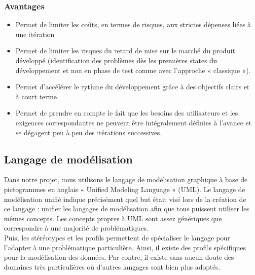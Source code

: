 \documentclass[12 pt ]{report}
\begin{document}
\subsubsection{Avantages }
\begin{itemize}[font=\color{green} \Large, label=]

\item Permet de limiter les coûts, en termes de risques, aux strictes dépenses liées à une itération
\item 	Permet de limiter les risques du retard de mise sur le marché du produit développé (identification des problèmes dès les premières states du développement et non en phase de test comme avec l’approche « classique »).
\item Permet d’accélérer le rythme du développement grâce à des objectifs clairs et à court terme.
\item Permet de prendre en compte le fait que les besoins des utilisateurs et les exigences correspondantes ne peuvent être intégralement définies à l’avance et se dégagent peu à peu des itérations successives.  
\end{itemize}
\subsection{Langage de modélisation }
     Dans notre projet, nous utilisons le langage de modélisation graphique à base de pictogrammes en anglais « Unified Modeling Language » (UML). Le langage de modélisation unifié indique précisément quel but était visé lors de la création de ce langage : unifier les langages de modélisation afin que tous puissent utiliser les mêmes concepts. Les concepts propres à UML sont assez génériques que correspondre à une majorité de problématiques.
\\

 Puis, les stéréotypes et les profils permettent de spécialiser le langage pour l’adapter à une problématique particulière. Ainsi, il existe des profils spécifiques pour la modélisation des données. Par contre, il existe sans aucun doute des domaines très particulières où d’autres langages sont bien plus adoptés.
\end{document}
